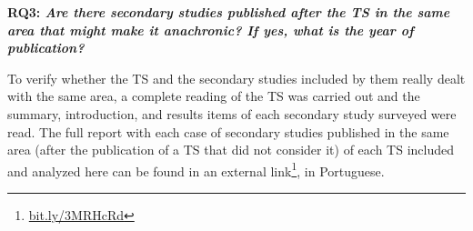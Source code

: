 \documentclass[sigconf]{acmart}
\begin{document}







 
\textbf{RQ3: \textit{Are there secondary studies published after the TS in the same area that might make it anachronic? If yes, what is the year of publication?}}

To verify whether the TS and the secondary studies included by them really dealt with the same area, a complete reading of the TS was carried out and the summary, introduction, and results items of each secondary study surveyed were read. The full report with each case of secondary studies published in the same area (after the publication of a TS that did not consider it) of each TS included and analyzed here can be found in an external link\footnote{\url{bit.ly/3MRHcRd}}, in Portuguese.
\end{document}
